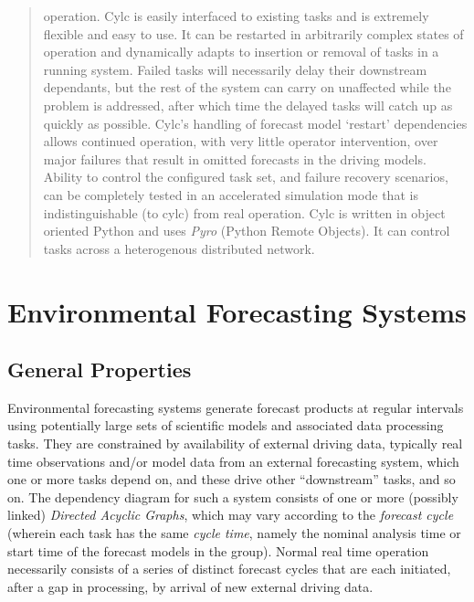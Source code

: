 \documentclass[11pt,a4paper]{article}
\begin{document}
\begin{abstract}
    operation. Cylc is easily interfaced to existing tasks and is
    extremely flexible and easy to use. It can be restarted in
    arbitrarily complex states of operation and dynamically adapts to
    insertion or removal of tasks in a running system.  Failed tasks
    will necessarily delay their downstream dependants, but the rest of
    the system can carry on unaffected while the problem is addressed,
    after which time the delayed tasks will catch up as quickly as
    possible.  Cylc's handling of forecast model `restart' dependencies
    allows continued operation, with very little operator intervention,
    over major failures that result in omitted forecasts in the driving
    models.  Ability to control the configured task set, and failure
    recovery scenarios, can be completely tested in an accelerated
    simulation mode that is indistinguishable (to cylc) from real
    operation.  Cylc is written in object oriented Python and uses {\em
    Pyro} (Python Remote Objects). It can control tasks across a
    heterogenous distributed network.  

\end{abstract}

\pagebreak
\section{Environmental Forecasting Systems}
\label{sec:FS}

\subsection{General Properties}

Environmental forecasting systems generate forecast products at regular
intervals using potentially large sets of scientific models and
associated data processing tasks. They are constrained by availability
of external driving data, typically real time observations and/or model
data from an external forecasting system, which one or more tasks depend
on, and these drive other ``downstream'' tasks, and so on. The
dependency diagram for such a system consists of one or more (possibly
linked) {\em Directed Acyclic Graphs}, which may vary according to the
{\em forecast cycle} (wherein each task has the same {\em cycle time},
namely the nominal analysis time or start time of the forecast models in
the group). Normal real time operation necessarily consists of a series
of distinct forecast cycles that are each initiated, after a gap in
processing, by arrival of new external driving data.
\end{document}
